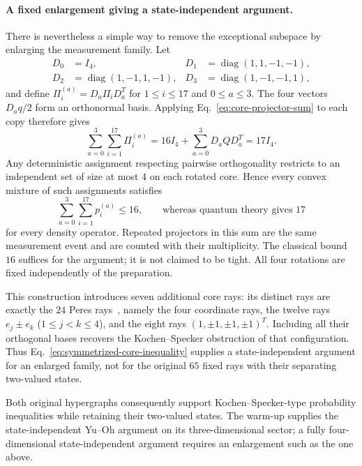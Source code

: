 \documentclass[
  aps,
  pra,
  reprint,
  superscriptaddress,
  amsmath,
  amssymb,
  nofootinbib,
  floatfix
]{revtex4-2}
\theoremstyle{definition}
\theoremstyle{remark}
\begin{document}
\paragraph*{A fixed enlargement giving a state-independent argument.}
There is nevertheless a simple way to remove the exceptional subspace by enlarging the measurement family. Let
\begin{equation}\label{eq:fixed-core-rotations}
\begin{aligned}
D_0&=I_4,&D_1&=\operatorname{diag}(1,1,-1,-1),\\
D_2&=\operatorname{diag}(1,-1,1,-1),&
D_3&=\operatorname{diag}(1,-1,-1,1),
\end{aligned}
\end{equation}
and define $\Pi_i^{(a)}=D_a\Pi_iD_a^T$ for $1\le i\le17$ and $0\le a\le3$. The four vectors $D_aq/2$ form an orthonormal basis. Applying Eq.~\eqref{eq:core-projector-sum} to each copy therefore gives
\begin{equation}\label{eq:symmetrized-core-operator}
\sum_{a=0}^{3}\sum_{i=1}^{17}\Pi_i^{(a)}
=16I_4+\sum_{a=0}^{3}D_aQD_a^T=17I_4.
\end{equation}
Any deterministic assignment respecting pairwise orthogonality restricts to an independent set of size at most $4$ on each rotated core. Hence every convex mixture of such assignments satisfies
\begin{equation}\label{eq:symmetrized-core-inequality}
\sum_{a=0}^{3}\sum_{i=1}^{17}p_i^{(a)}\le16,
\qquad\text{whereas quantum theory gives }17
\end{equation}
for every density operator. Repeated projectors in this sum are the same measurement event and are counted with their multiplicity. The classical bound $16$ suffices for the argument; it is not claimed to be tight. All four rotations are fixed independently of the preparation.

This construction introduces seven additional core rays: its distinct rays are exactly the $24$ Peres rays~\cite{peres-91}, namely the four coordinate rays, the twelve rays $e_j\pm e_k$ ($1\le j<k\le4$), and the eight rays $(1,\pm1,\pm1,\pm1)^T$. Including all their orthogonal bases recovers the Kochen--Specker obstruction of that configuration. Thus Eq.~\eqref{eq:symmetrized-core-inequality} supplies a state-independent argument for an enlarged family, not for the original $65$ fixed rays with their separating two-valued states.

Both original hypergraphs consequently support Kochen--Specker-type probability inequalities while retaining their two-valued states. The warm-up supplies the state-independent Yu--Oh argument on its three-dimensional sector; a fully four-dimensional state-independent argument requires an enlargement such as the one above.
\end{document}

